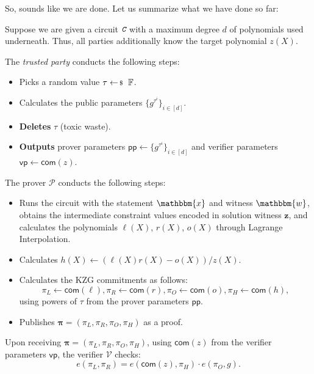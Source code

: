 \documentclass[../lecture-notes-148x210.tex]{subfiles}
\begin{document}
So, sounds like we are done. Let us summarize what we have done so far:
\begin{tcolorbox}[title=Attempt \#1: Non-sound SNARK Protocol,
    breakable,
    colback=blue!5!white,
    colframe=blue!75!black,
    colbacktitle=blue!25!white,
    coltitle=blue!20!black,
    fonttitle=\bfseries,
    boxrule=1.25pt,
    subtitle style={boxrule=0pt,
    colback=blue!20!white,
    colupper=blue!75!gray} ]

    Suppose we are given a circuit $\textit{\texttt{C}}$ with a maximum degree $d$ of polynomials used underneath. Thus, all parties additionally know the target polynomial $z(X)$.

    The \emph{trusted party} conducts the following steps:
    \begin{itemize}[label=]
        \item Picks a random value $\tau \leftarrowS \mathbb{F}$.
        \item Calculates the public parameters $\{g^{\tau^i}\}_{i \in [d]}$.
        \item \textbf{Deletes} $\tau$ (toxic waste).
        \item \textbf{Outputs} prover parameters $\mathsf{pp} \gets \{g^{\tau^i}\}_{i \in [d]}$ and verifier parameters $\mathsf{vp} \gets \mathsf{com}(z)$.
    \end{itemize}
    The prover $\mathcal{P}$ conducts the following steps:
    \begin{itemize}[label=]
        \item Runs the circuit with the statement $\mathbbm{x}$ and witness
        $\mathbbm{w}$, obtains the intermediate constraint values encoded in
        solution witness $\mathbf{z}$, and calculates the polynomials $\ell(X)$,
        $r(X)$, $o(X)$ through Lagrange Interpolation.
        \item Calculates $h(X) \gets (\ell(X)r(X) - o(X))\big/ z(X)$.
        \item Calculates the KZG commitments as follows: 
        \begin{equation*}
            \pi_L \gets \mathsf{com}(\ell), \pi_R \gets \mathsf{com}(r), \pi_O \gets \mathsf{com}(o), \pi_H \gets \mathsf{com}(h),
        \end{equation*}
        using powers of $\tau$ from the prover parameters $\mathsf{pp}$.
        \item Publishes $\boldsymbol{\pi} = (\pi_L,\pi_R,\pi_O,\pi_H)$ as a proof.
    \end{itemize}
    Upon receiving $\boldsymbol{\pi} = (\pi_L,\pi_R,\pi_O,\pi_H)$, using $\mathsf{com}(z)$ from the verifier parameters $\mathsf{vp}$, the verifier $\mathcal{V}$ checks:
    \begin{equation*}
        e(\pi_L, \pi_R) = e(\mathsf{com}(z), \pi_H) \cdot e(\pi_O, g).
    \end{equation*}
\end{tcolorbox}
\end{document}
